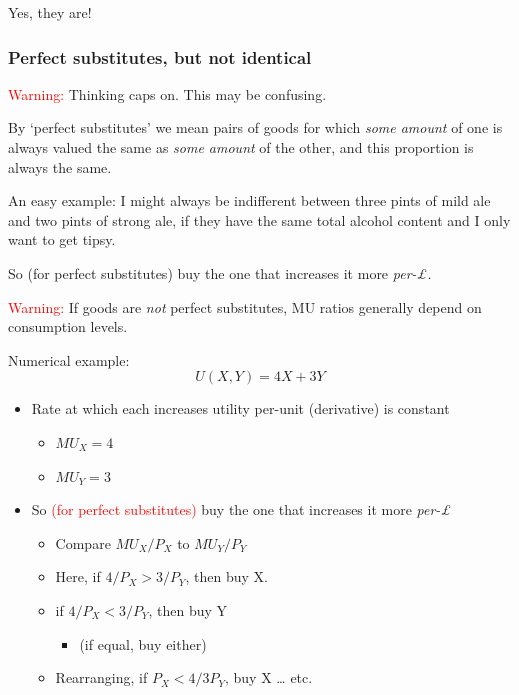 \documentclass[]{article}
\providecommand{\tightlist}{%
  \setlength{\itemsep}{0pt}\setlength{\parskip}{0pt}}
\begin{document}
Yes, they are!

\hypertarget{perfect-substitutes-but-not-identical}{%
\subsubsection{Perfect substitutes, but not identical}\label{perfect-substitutes-but-not-identical}}

\textcolor{red}{Warning:} Thinking caps on. This may be confusing.

By `perfect substitutes' we mean pairs of goods for which \emph{some amount} of one is always valued the same as \emph{some amount} of the other, and this proportion is always the same.

An easy example: I might always be indifferent between three pints of mild ale and two pints of strong ale, if they have the same total alcohol content and I only want to get tipsy.

So (for perfect substitutes) buy the one that increases it more \emph{per-\pounds.}

\textcolor{red}{Warning:} If goods are \emph{not} perfect substitutes, MU ratios generally depend on consumption levels.

\bigskip

Numerical example:\\

\[U(X,Y)=4X+3Y\]

\begin{itemize}
\tightlist
\item
  Rate at which each increases utility per-unit (derivative) is constant

  \begin{itemize}
  \tightlist
  \item
    \(MU_X = 4\)
  \item
    \(MU_Y = 3\)
  \end{itemize}
\item
  So \textcolor{red}{(for perfect substitutes)} buy the one that increases it more \emph{per-£}

  \begin{itemize}
  \tightlist
  \item
    Compare \(MU_X/P_X\) to \(MU_Y/P_Y\)
  \item
    Here, if \(4/P_X > 3/P_Y\), then buy X.
  \item
    if \(4/P_X < 3/P_Y\), then buy Y

    \begin{itemize}
    \tightlist
    \item
      (if equal, buy either)
    \end{itemize}
  \item
    Rearranging, if \(P_X < 4/3 P_Y\), buy X \ldots{} etc.
  \end{itemize}
\end{itemize}
\end{document}
